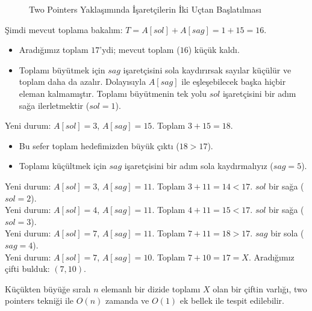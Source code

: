 \begin{figure}[h]
\centering
{}
\caption{Two Pointers Yaklaşımında İşaretçilerin İki Uçtan Başlatılması}
\end{figure}

Şimdi mevcut toplama bakalım: $T = A[sol] + A[sag] = 1 + 15 = 16$.
\begin{itemize}
    \item Aradığımız toplam $17$'ydi; mevcut toplam ($16$) küçük kaldı.
    \item Toplamı büyütmek için $sag$ işaretçisini sola kaydırırsak sayılar küçülür ve toplam daha da azalır. Dolayısıyla $A[sag]$ ile eşleşebilecek başka hiçbir eleman kalmamıştır. Toplamı büyütmenin tek yolu $sol$ işaretçisini bir adım sağa ilerletmektir ($sol = 1$).
\end{itemize}

Yeni durum: $A[sol] = 3$, $A[sag] = 15$. Toplam $3 + 15 = 18$.
\begin{itemize}
    \item Bu sefer toplam hedefimizden büyük çıktı ($18 > 17$).
    \item Toplamı küçültmek için $sag$ işaretçisini bir adım sola kaydırmalıyız ($sag = 5$).
\end{itemize}

Yeni durum: $A[sol] = 3$, $A[sag] = 11$. Toplam $3 + 11 = 14 < 17$. $sol$ bir sağa ($sol = 2$).\\
Yeni durum: $A[sol] = 4$, $A[sag] = 11$. Toplam $4 + 11 = 15 < 17$. $sol$ bir sağa ($sol = 3$).\\
Yeni durum: $A[sol] = 7$, $A[sag] = 11$. Toplam $7 + 11 = 18 > 17$. $sag$ bir sola ($sag = 4$).\\
Yeni durum: $A[sol] = 7$, $A[sag] = 10$. Toplam $7 + 10 = 17 = X$. Aradığımız çifti bulduk: $(7, 10)$.

\begin{theorem}
Küçükten büyüğe sıralı $n$ elemanlı bir dizide toplamı $X$ olan bir çiftin varlığı, two pointers tekniği ile $O(n)$ zamanda ve $O(1)$ ek bellek ile tespit edilebilir.
\end{theorem}

